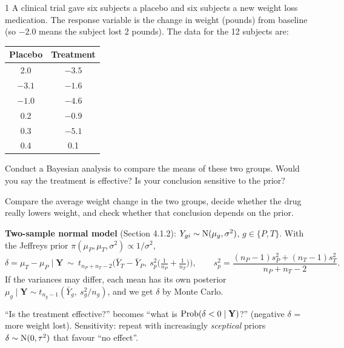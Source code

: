 \documentclass[11pt]{article}
\begin{document}
\clearpage


\begin{problem}{1}
A clinical trial gave six subjects a placebo and six subjects a new weight loss medication. The response variable is the change in weight (pounds) from baseline (so $-2.0$ means the subject lost 2 pounds). The data for the 12 subjects are:
\begin{center}
\begin{tabular}{cc}\toprule Placebo & Treatment\\\midrule 2.0 & $-3.5$\\ $-3.1$ & $-1.6$\\ $-1.0$ & $-4.6$\\ 0.2 & $-0.9$\\ 0.3 & $-5.1$\\ 0.4 & 0.1\\\bottomrule\end{tabular}
\end{center}
Conduct a Bayesian analysis to compare the means of these two groups. Would you say the treatment is effective? Is your conclusion sensitive to the prior?
\end{problem}

\begin{restate}
Compare the average weight change in the two groups, decide whether the drug really lowers weight, and check whether that conclusion depends on the prior.
\end{restate}

\begin{recall}
\textbf{Two-sample normal model} (Section 4.1.2): $Y_{gi}\sim\mathrm{N}(\mu_g,\sigma^2)$, $g\in\{P,T\}$. With the Jeffreys prior $\pi(\mu_P,\mu_T,\sigma^2)\propto1/\sigma^2$,
\[
\delta=\mu_T-\mu_P\mid\mathbf Y\ \sim\ t_{n_P+n_T-2}\Big(\bar Y_T-\bar Y_P,\ s_p^2\big(\tfrac1{n_P}+\tfrac1{n_T}\big)\Big),\qquad s_p^2=\frac{(n_P-1)s_P^2+(n_T-1)s_T^2}{n_P+n_T-2}.
\]
If the variances may differ, each mean has its own posterior $\mu_g\mid\mathbf Y\sim t_{n_g-1}(\bar Y_g,\ s_g^2/n_g)$, and we get $\delta$ by Monte Carlo.
\end{recall}

\begin{keyidea}
``Is the treatment effective?'' becomes ``what is $\mathrm{Prob}(\delta<0\mid\mathbf Y)$?'' (negative $\delta$ = more weight lost). Sensitivity: repeat with increasingly \emph{sceptical} priors $\delta\sim\mathrm{N}(0,\tau^2)$ that favour ``no effect''.
\end{keyidea}
\end{document}
